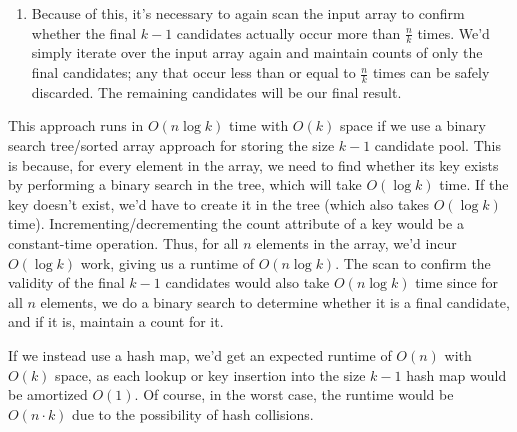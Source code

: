 \documentclass[12pt]{article}
\begin{document}
\begin{enumerate}
\begin{enumerate}
        \item Because of this, it's necessary to again scan the input array to confirm whether the final 
        $k - 1$ candidates actually occur more than $\frac{n}{k}$ times. We'd simply iterate over the input array 
        again and maintain counts of only the final candidates; any that occur less than or equal to $\frac{n}{k}$ 
        times can be safely discarded. The remaining candidates will be our final result.
    \end{enumerate}

    This approach runs in $O(n\log k)$ time with $O(k)$ space if we use a binary search tree/sorted array approach 
    for storing the size $k - 1$ candidate pool. This is because, for every element in the array, we need to 
    find whether its key exists by performing a binary search in the tree, which will take $O(\log k)$ time. If the 
    key doesn't exist, we'd have to create it in the tree (which also takes $O(\log k)$ time). Incrementing/decrementing 
    the count attribute of a key would be a constant-time operation. Thus, for all $n$ elements in the array, 
    we'd incur $O(\log k)$ work, giving us a runtime of $O(n\log k)$. The scan to confirm the validity of the final 
    $k - 1$ candidates would also take $O(n\log k)$ time since for all $n$ elements, we do a binary search to 
    determine whether it is a final candidate, and if it is, maintain a count for it.

    If we instead use a hash map, we'd get an expected runtime of $O(n)$ with $O(k)$ space, as each lookup or key 
    insertion into the size $k - 1$ hash map would be amortized $O(1)$. Of course, in the worst case, the runtime would 
    be $O(n \cdot k)$ due to the possibility of hash collisions.
\end{enumerate}
\end{document}
